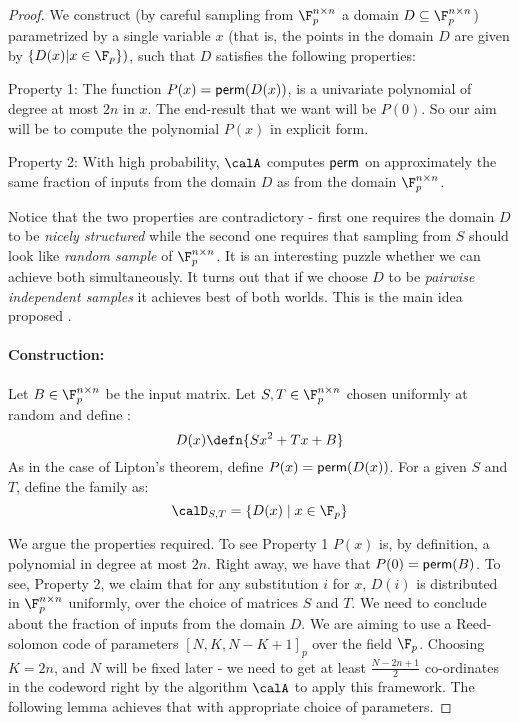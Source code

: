 \begin{proof}
We construct (by careful sampling from $\F_p^{n \times n}$ a domain $D \subseteq \F_p^{n \times n}$) parametrized by a single variable
$x$ (that is, the points in the domain $D$ are given by $\{D(x)| x \in \F_p \})$, such that $D$ satisfies the following properties:
\begin{description}
\item{\sf Property 1:} The function $P(x) = {\sf perm}(D(x))$, is a univariate polynomial of degree at most $2n$ in $x$. The end-result that we want will be $P(0)$. So our aim will be to compute the polynomial $P(x)$ in explicit form.
\item{\sf Property 2:} With high probability, $\calA$ computes ${\sf perm}$ on approximately the same fraction of inputs from the
domain $D$ as from the domain $\F_p^{n \times n}$.
\end{description}

Notice that the two properties are contradictory - first one requires the domain $D$ to be \textit{nicely structured} while the second one requires that sampling from $S$ should look like \textit{random sample} of $\F_p^{n \times n}$. It is an interesting puzzle whether we can achieve both simultaneously. It turns out that if we choose $D$ to be {\em pairwise independent samples} it achieves best of both worlds. This is the main idea proposed \cite{GS92}.\\[-8mm]

\paragraph{Construction:} Let $B \in \F_p^{n \times n}$ be the input matrix. Let $S,T \in \F_p^{n \times n}$ chosen uniformly at random and define :
$$D(x) \defn \{ Sx^2 + Tx + B \}$$
As in the case of Lipton's theorem, define $P(x) = {\sf perm}(D(x))$. 
For a given $S$ and $T$, define the family as:
$$\calD_{S,T} = \{ D(x) \mid x \in \F_p \}$$

\noindent We argue the properties required. To see {\sf Property 1} $P(x)$ is, by definition, a polynomial in degree at most $2n$. Right away, we have that $P(0) = {\sf perm}(B)$. To see, {\sf Property 2}, we claim that for any substitution $i$ for $x$, $D(i)$ is distributed in $\F_p^{n \times n}$ uniformly, over the choice of matrices $S$ and $T$. We need to conclude about the fraction of inputs from the domain $D$. We are aiming to use a Reed-solomon code of parameters $[N,K,N-K+1]_p$ over the field $\F_p$. Choosing $K=2n$, and $N$ will be fixed later - we need to get at least $\frac{N-2n+1}{2}$ co-ordinates in the codeword right by the algorithm $\calA$ to apply this framework. The following lemma achieves that with appropriate choice of parameters.


\end{proof}
